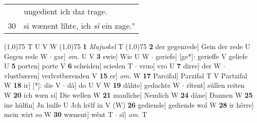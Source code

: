 \documentclass[8pt,a4paper,notitlepage]{article}
\begin{document}
\begin{table}[ht]
\begin{minipage}[t]{0.5\linewidth}
\begin{tabular}{rl}
 & ungedient ich daz trage.\\ 
30 & si wænent lîhte, ich \textit{sî} ein zage."\\ 
\end{tabular}
\scriptsize
\line(1,0){75} \newline
T U V W \newline
\line(1,0){75} \newline
\textbf{1} \textit{Majuskel} T  \newline
\line(1,0){75} \newline
\textbf{2} der gegenrede] Gein der rede U Gegen rede W  $\cdot$ gar] \textit{om.} U V \textbf{3} swie] Wie U W  $\cdot$ geriefe] [ge*]: gerieffe V geliefe U \textbf{5} porten] porte V \textbf{6} scheiden] scieden T  $\cdot$ vruo] vro U \textbf{7} dirre] der W  $\cdot$ vlustbæren] verlvstberenden V \textbf{15} er] \textit{om.} W \textbf{17} Parcifal] Parzifal T V Partzifal W \textbf{18} ir] [*]: die V  $\cdot$ dâ] do U V W \textbf{19} dâhte] gedachte W  $\cdot$ rîtent] súllen reiten W \textbf{20} ich wæn si] Die wellen W \textbf{21} manlîche] Nemlich W \textbf{24} dâne] Dannen W \textbf{25} ine hülfin] Jn hulfe U Jch hv́lf in V (W) \textbf{26} gediende] gediende wol W \textbf{28} ir hêrre] mein wirt so W \textbf{30} wænent] wênt T  $\cdot$ sî] \textit{om.} T \newline
\end{minipage}
\end{table}
\end{document}
